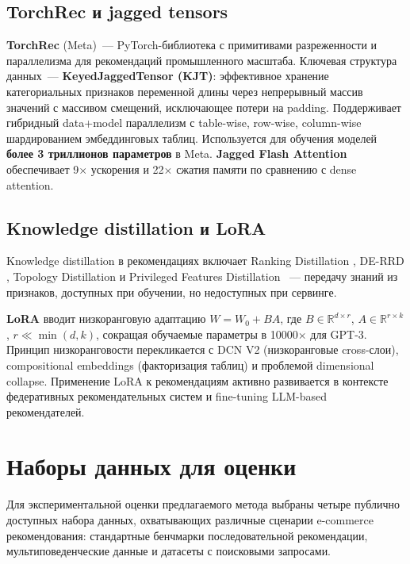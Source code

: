 \subsection{TorchRec и jagged tensors}
\label{subsec:ch1:torchrec}

\textbf{TorchRec} \cite{ivchenko2022torchrec} (Meta)~--- PyTorch-библиотека с примитивами разреженности и параллелизма для рекомендаций промышленного масштаба. Ключевая структура данных~--- \textbf{KeyedJaggedTensor (KJT)}: эффективное хранение категориальных признаков переменной длины через непрерывный массив значений с массивом смещений, исключающее потери на padding. Поддерживает гибридный data+model параллелизм с table-wise, row-wise, column-wise шардированием эмбеддинговых таблиц. Используется для обучения моделей \textbf{более 3 триллионов параметров} в Meta. \textbf{Jagged Flash Attention} обеспечивает 9$\times$ ускорения и 22$\times$ сжатия памяти по сравнению с dense attention.

\subsection{Knowledge distillation и LoRA}
\label{subsec:ch1:distillation}

Knowledge distillation в рекомендациях включает Ranking Distillation \cite{tang2018ranking}, DE-RRD \cite{kang2020derr}, Topology Distillation \cite{kang2021topology} и Privileged Features Distillation \cite{xu2020privileged}~--- передачу знаний из признаков, доступных при обучении, но недоступных при сервинге.

\textbf{LoRA} \cite{hu2022lora} вводит низкоранговую адаптацию $W = W_0 + BA$, где $B \in \mathbb{R}^{d \times r}$, $A \in \mathbb{R}^{r \times k}$, $r \ll \min(d, k)$, сокращая обучаемые параметры в 10000$\times$ для GPT-3. Принцип низкоранговости перекликается с DCN V2 (низкоранговые cross-слои), compositional embeddings (факторизация таблиц) и проблемой dimensional collapse. Применение LoRA к рекомендациям активно развивается в контексте федеративных рекомендательных систем \cite{nguyen2024fedlora} и fine-tuning LLM-based рекомендателей.

\section{Наборы данных для оценки}
\label{sec:ch1:datasets}

Для экспериментальной оценки предлагаемого метода выбраны четыре публично доступных набора данных, охватывающих различные сценарии e-commerce рекомендования: стандартные бенчмарки последовательной рекомендации, мультиповеденческие данные и датасеты с поисковыми запросами.

